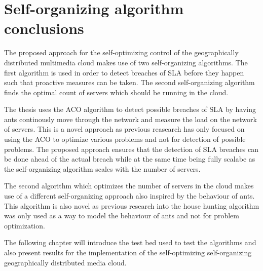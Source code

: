 \section{Self-organizing algorithm conclusions}

The proposed approach for the self-optimizing control of the geographically distributed multimedia cloud makes use of two self-organizing algorithms. The first algorithm is used in order to detect breaches of SLA before they happen such that proactive measures can be taken. The second self-organizing algorithm finds the optimal count of servers which should be running in the cloud.

The thesis uses the ACO algorithm to detect possible breaches of SLA by having ants continously move through the network and measure the load on the network of servers. This is a novel approach as previous reasearch has only focused on using the ACO to optimize various problems and not for detection of possible problems. The proposed approach ensures that the detection of SLA breaches can be done ahead of the actual breach while at the same time being fully scalabe as the self-organizing algorithm scales with the number of servers.

The second algorithm which optimizes the number of servers in the cloud makes use of a different self-organizing approach also inspired by the behaviour of ants. This algorithm is also novel as previous research into the house hunting algorithm was only used as a way to model the behaviour of ants and not for problem optimization.

The following chapter will introduce the test bed used to test the algorithms and also present results for the implementation of the self-optimizing self-organizing geographically distributed media cloud.